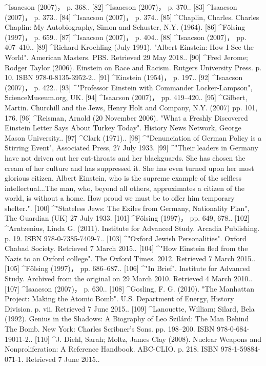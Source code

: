 ^Isaacson (2007)， p. 368..
[82]
^Isaacson (2007)， p. 370..
[83]
^Isaacson (2007)， p. 373..
[84]
^Isaacson (2007)， p. 374..
[85]
^Chaplin, Charles. Charles Chaplin: My Autobiography, Simon and Schuster, N.Y. (1964).
[86]
^Fölsing (1997)， p. 659..
[87]
^Isaacson (2007)， p. 404..
[88]
^Isaacson (2007)， pp. 407–410..
[89]
^Richard Kroehling (July 1991). "Albert Einstein: How I See the World". American Masters. PBS. Retrieved 29 May 2018..
[90]
^Fred Jerome; Rodger Taylor (2006). Einstein on Race and Racism. Rutgers University Press. p. 10. ISBN 978-0-8135-3952-2..
[91]
^Einstein (1954)， p. 197..
[92]
^Isaacson (2007)， p. 422..
[93]
^"Professor Einstein with Commander Locker-Lampson", ScienceMuseum.org, UK.
[94]
^Isaacson (2007)， pp. 419–420..
[95]
^Gilbert, Martin. Churchill and the Jews, Henry Holt and Company, N.Y. (2007) pp. 101, 176.
[96]
^Reisman, Arnold (20 November 2006). "What a Freshly Discovered Einstein Letter Says About Turkey Today". History News Network, George Mason University..
[97]
^Clark (1971)..
[98]
^"Denunciation of German Policy is a Stirring Event", Associated Press, 27 July 1933.
[99]
^"Their leaders in Germany have not driven out her cut-throats and her blackguards. She has chosen the cream of her culture and has suppressed it. She has even turned upon her most glorious citizen, Albert Einstein, who is the supreme example of the selfless intellectual...The man, who, beyond all others, approximates a citizen of the world, is without a home. How proud we must be to offer him temporary shelter.".
[100]
^"Stateless Jews: The Exiles from Germany, Nationality Plan", The Guardian (UK) 27 July 1933.
[101]
^Fölsing (1997)， pp. 649, 678..
[102]
^Arntzenius, Linda G. (2011). Institute for Advanced Study. Arcadia Publishing. p. 19. ISBN 978-0-7385-7409-7..
[103]
^"Oxford Jewish Personalities". Oxford Chabad Society. Retrieved 7 March 2015..
[104]
^"How Einstein fled from the Nazis to an Oxford college". The Oxford Times. 2012. Retrieved 7 March 2015..
[105]
^Fölsing (1997)， pp. 686–687..
[106]
^"In Brief". Institute for Advanced Study. Archived from the original on 29 March 2010. Retrieved 4 March 2010..
[107]
^Isaacson (2007)， p. 630..
[108]
^Gosling, F. G. (2010). "The Manhattan Project: Making the Atomic Bomb". U.S. Department of Energy, History Division. p. vii. Retrieved 7 June 2015..
[109]
^Lanouette, William; Silard, Bela (1992). Genius in the Shadows: A Biography of Leo Szilárd: The Man Behind The Bomb. New York: Charles Scribner's Sons. pp. 198–200. ISBN 978-0-684-19011-2..
[110]
^J. Diehl, Sarah; Moltz, James Clay (2008). Nuclear Weapons and Nonproliferation: A Reference Handbook. ABC-CLIO. p. 218. ISBN 978-1-59884-071-1. Retrieved 7 June 2015..

